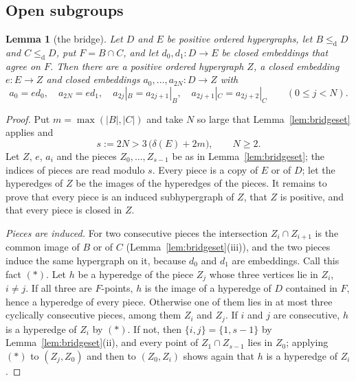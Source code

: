 \documentclass[11pt,a4paper]{article}
\newtheorem{lemma}[theorem]{Lemma}
\theoremstyle{definition}
\newcommand{\cle}{\leq_{\mathrm{d}}}
\begin{document}
\subsection{Open subgroups}

\begin{lemma}[the bridge]\label{lem:bridgedelta}
Let $D$ and $E$ be positive ordered hypergraphs, let $B\cle D$ and $C\cle D$,
put $F=B\cap C$, and let $d_0,d_1\colon D\to E$ be closed embeddings that agree
on $F$. Then there are a positive ordered hypergraph $Z$, a closed embedding
$e\colon E\to Z$ and closed embeddings $a_0,\dots,a_{2N}\colon D\to Z$ with
\[
 a_0=ed_0,\quad a_{2N}=ed_1,\quad a_{2j}|_B=a_{2j+1}|_B,\quad
 a_{2j+1}|_C=a_{2j+2}|_C\qquad(0\le j<N).
\]
\end{lemma}

\begin{proof}
Put $m=\max(|B|,|C|)$ and take $N$ so large that Lemma~\ref{lem:bridgeset}
applies and
\begin{equation}\label{eq:Nbound}
 s:=2N>3\,\bigl(\delta(E)+2m\bigr),\qquad N\ge 2 .
\end{equation}
Let $Z$, $e$, $a_i$ and the pieces $Z_0,\dots,Z_{s-1}$ be as in
Lemma~\ref{lem:bridgeset}; the indices of pieces are read modulo $s$. Every
piece is a copy of $E$ or of $D$; let the hyperedges of $Z$ be the images of
the hyperedges of the pieces. It remains to prove that every piece is an
induced subhypergraph of $Z$, that $Z$ is positive, and that every piece is
closed in $Z$.

\emph{Pieces are induced.} For two consecutive pieces the intersection
$Z_i\cap Z_{i+1}$ is the common image of $B$ or of $C$ (Lemma~\ref{lem:bridgeset}(iii)), and the two pieces induce
the same hypergraph on it, because $d_0$ and $d_1$ are embeddings. Call this
fact $(\ast)$. Let $h$ be a hyperedge of the piece $Z_j$ whose three vertices lie in
$Z_i$, $i\ne j$. If all three are $F$-points, $h$ is the image of a hyperedge
of $D$ contained in $F$, hence a hyperedge of every piece. Otherwise one of
them lies in at most three cyclically consecutive pieces, among them $Z_i$ and
$Z_j$. If $i$ and $j$ are consecutive, $h$ is a hyperedge of $Z_i$ by $(\ast)$.
If not, then $\{i,j\}=\{1,s-1\}$ by Lemma~\ref{lem:bridgeset}(ii), and every
point of $Z_1\cap Z_{s-1}$ lies in $Z_0$; applying $(\ast)$ to $(Z_j,Z_0)$ and
then to $(Z_0,Z_i)$ shows again that $h$ is a hyperedge of $Z_i$.


\end{proof}
\end{document}
